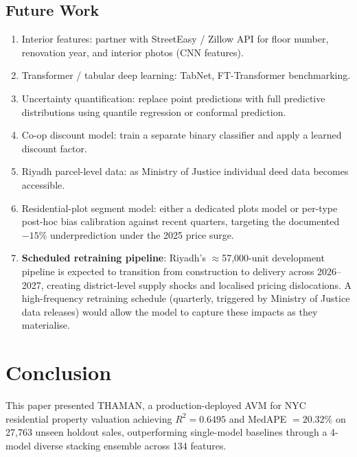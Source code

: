 \documentclass[11pt, a4paper, twoside]{article}
\begin{document}
\subsection{Future Work}
\begin{enumerate}
  \item Interior features: partner with StreetEasy / Zillow API for floor number,
        renovation year, and interior photos (CNN features).
  \item Transformer / tabular deep learning: TabNet, FT-Transformer benchmarking.
  \item Uncertainty quantification: replace point predictions with full predictive
        distributions using quantile regression or conformal prediction.
  \item Co-op discount model: train a separate binary classifier and apply a learned
        discount factor.
  \item Riyadh parcel-level data: as Ministry of Justice individual deed data becomes
        accessible.
  \item Residential-plot segment model: either a dedicated plots model or per-type
        post-hoc bias calibration against recent quarters, targeting the documented
        $-15\%$ underprediction under the 2025 price surge.
  \item \textbf{Scheduled retraining pipeline}: Riyadh's $\approx$57,000-unit
        development pipeline is expected to transition from construction to delivery
        across 2026--2027, creating district-level supply shocks and localised
        pricing dislocations. A high-frequency retraining schedule (quarterly,
        triggered by Ministry of Justice data releases) would allow the model to
        capture these impacts as they materialise.
\end{enumerate}

\section{Conclusion}
\label{sec:conclusion}

This paper presented THAMAN, a production-deployed AVM for NYC residential
property valuation achieving $R^2 = 0.6495$ and MedAPE $= 20.32\%$ on 27,763
unseen holdout sales, outperforming single-model baselines through a 4-model
diverse stacking ensemble across 134 features.
\end{document}
